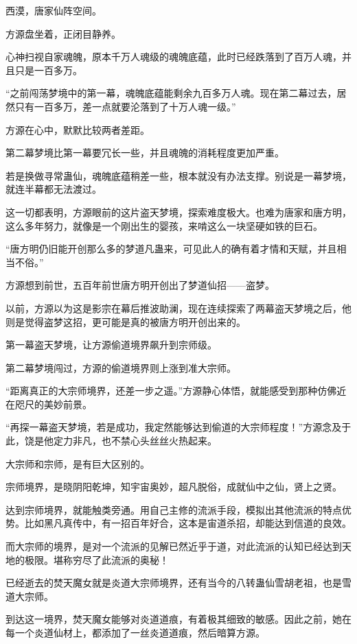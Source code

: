 
\begin{this_body}

西漠，唐家仙阵空间。

方源盘坐着，正闭目静养。

心神扫视自家魂魄，原本千万人魂级的魂魄底蕴，此时已经跌落到了百万人魂，并且只是一百多万。

“之前闯荡梦境中的第一幕，魂魄底蕴能剩余九百多万人魂。现在第二幕过去，居然只有一百多万，差一点就要沦落到了十万人魂一级。”

方源在心中，默默比较两者差距。

第二幕梦境比第一幕要冗长一些，并且魂魄的消耗程度更加严重。

若是换做寻常蛊仙，魂魄底蕴稍差一些，根本就没有办法支撑。别说是一幕梦境，就连半幕都无法渡过。

这一切都表明，方源眼前的这片盗天梦境，探索难度极大。也难为唐家和唐方明，这么多年努力，就像是一个刚出生的婴孩，来啃这么一块坚硬如铁的巨石。

“唐方明仍旧能开创那么多的梦道凡蛊来，可见此人的确有着才情和天赋，并且相当不俗。”

方源想到前世，五百年前世唐方明开创出了梦道仙招——盗梦。

以前，方源以为这是影宗在幕后推波助澜，现在连续探索了两幕盗天梦境之后，他则是觉得盗梦这招，更可能是真的被唐方明开创出来的。

第一幕盗天梦境，让方源偷道境界飙升到宗师级。

第二幕梦境闯过，方源的偷道境界则上涨到准大宗师。

“距离真正的大宗师境界，还差一步之遥。”方源静心体悟，就能感受到那种仿佛近在咫尺的美妙前景。

“再探一幕盗天梦境，若是成功，我定然能够达到偷道的大宗师程度！”方源念及于此，饶是他定力非凡，也不禁心头丝丝火热起来。

大宗师和宗师，是有巨大区别的。

宗师境界，是晓阴阳乾坤，知宇宙奥妙，超凡脱俗，成就仙中之仙，贤上之贤。

达到宗师境界，就能触类旁通。用自己主修的流派手段，模拟出其他流派的特点优势。比如黑凡真传中，有一招百年好合，这本是宙道杀招，却能达到信道的良效。

而大宗师的境界，是对一个流派的见解已然近乎于道，对此流派的认知已经达到天地的极限。堪称穷尽了此流派的奥秘！

已经逝去的焚天魔女就是炎道大宗师境界，还有当今的八转蛊仙雪胡老祖，也是雪道大宗师。

到达这一境界，焚天魔女能够对炎道道痕，有着极其细致的敏感。因此之前，她在每一个炎道仙材上，都添加了一丝炎道道痕，然后暗算方源。


\end{this_body}
